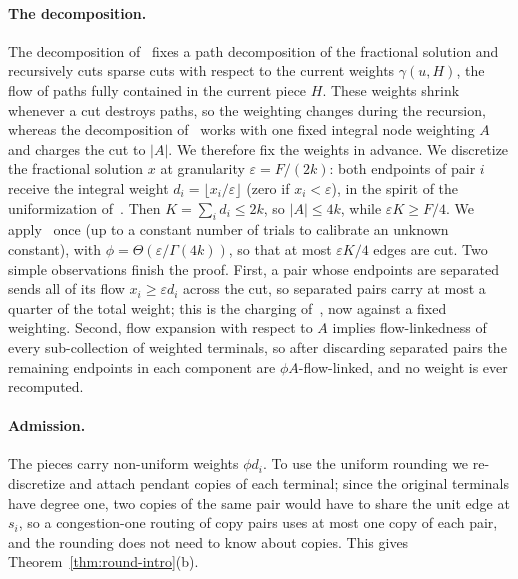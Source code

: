 \documentclass[11pt,letterpaper]{article}
\theoremstyle{definition}
\newcommand{\eps}{\varepsilon}
\begin{document}
\paragraph{The decomposition.}
The decomposition of~\cite{CKS05} fixes a path decomposition of the fractional solution and
recursively cuts sparse cuts with respect to the current weights $\gamma(u,H)$, the flow of
paths fully contained in the current piece $H$. These weights shrink whenever a cut destroys
paths, so the weighting changes during the recursion, whereas the decomposition
of~\cite{BJS26} works with one fixed integral node weighting $A$ and charges the cut to $|A|$.
We therefore fix the weights in advance. We discretize the fractional solution $x$ at
granularity $\eps=F/(2k)$: both endpoints of pair $i$ receive the integral weight
$d_i=\lfloor x_i/\eps\rfloor$ (zero if $x_i<\eps$), in the spirit of the uniformization
of~\cite[Lemma~1.1]{CKS05}. Then $K=\sum_id_i\le2k$, so $|A|\le4k$, while $\eps K\ge F/4$. We
apply~\cite{BJS26} once (up to a constant number of trials to calibrate an unknown constant),
with $\phi=\Theta(\eps/\Gamma(4k))$, so that at most $\eps K/4$ edges are cut. Two simple
observations finish the proof. First, a pair whose endpoints are separated sends all of its
flow $x_i\ge\eps d_i$ across the cut, so separated pairs carry at most a quarter of the total
weight; this is the charging of~\cite[Lemma~2.2]{CKS05}, now against a fixed weighting. Second,
flow expansion with respect to $A$ implies flow-linkedness of every sub-collection of weighted
terminals, so after discarding separated pairs the remaining endpoints in each component are
$\phi A$-flow-linked, and no weight is ever recomputed.

\paragraph{Admission.}
The pieces carry non-uniform weights $\phi d_i$. To use the uniform rounding we re-discretize
and attach pendant copies of each terminal; since the original terminals have degree one, two
copies of the same pair would have to share the unit edge at $s_i$, so a congestion-one routing
of copy pairs uses at most one copy of each pair, and the rounding does not need to know about
copies. This gives Theorem~\ref{thm:round-intro}(b).
\end{document}
